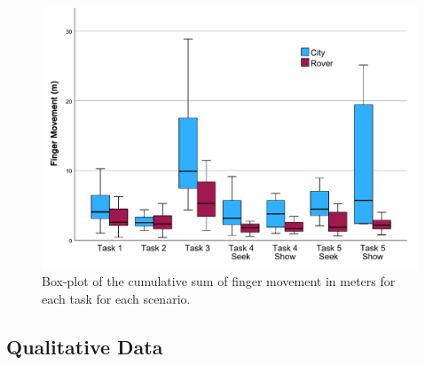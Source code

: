             \begin{figure}[h]
                \centering
                \includegraphics[width=1\linewidth]{figures/finger_movement_graph.pdf}
                \caption{Box-plot of the cumulative sum of finger movement in meters for each task for each scenario.}
                \label{fig:finger_movement}
            \end{figure}




    \subsection{Qualitative Data}



